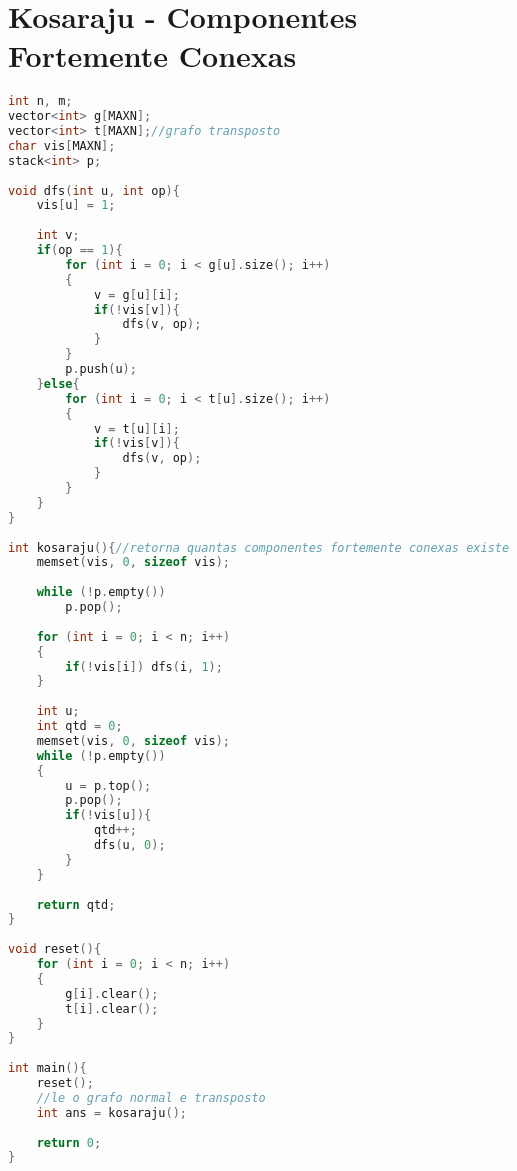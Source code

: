\documentclass[12pt,a4paper,twoside]{report}
\begin{document}
\section{Kosaraju - Componentes Fortemente Conexas}
\noindent\begin{lstlisting}[caption=Kosaraju - Componentes Fortemente Conexas,language=C++]
int n, m;
vector<int> g[MAXN];
vector<int> t[MAXN];//grafo transposto
char vis[MAXN];
stack<int> p;
 
void dfs(int u, int op){
    vis[u] = 1;
     
    int v;
    if(op == 1){
        for (int i = 0; i < g[u].size(); i++)
        {
            v = g[u][i];
            if(!vis[v]){
                dfs(v, op);
            }
        }
        p.push(u);
    }else{
        for (int i = 0; i < t[u].size(); i++)
        {
            v = t[u][i];
            if(!vis[v]){
                dfs(v, op);
            }
        }
    }
}
 
int kosaraju(){//retorna quantas componentes fortemente conexas existe
    memset(vis, 0, sizeof vis);
     
    while (!p.empty())
        p.pop();
     
    for (int i = 0; i < n; i++)
    {
        if(!vis[i]) dfs(i, 1);
    }
     
    int u;
    int qtd = 0;
    memset(vis, 0, sizeof vis);
    while (!p.empty())
    {
        u = p.top();
        p.pop();
        if(!vis[u]){
            qtd++;
            dfs(u, 0);
        }
    }
     
    return qtd;
}
 
void reset(){
    for (int i = 0; i < n; i++)
    {
        g[i].clear();
        t[i].clear();
    }
}
 
int main(){
    reset();
    //le o grafo normal e transposto
    int ans = kosaraju();
     
    return 0;
}
\end{lstlisting}
\end{document}
